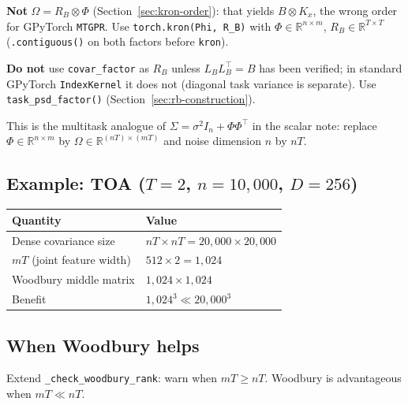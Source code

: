 \documentclass[11pt]{article}
\theoremstyle{plain}
\newcommand{\noise}{\sigma^2}
\newcommand{\Sig}{\Sigma}
\newcommand{\Ph}{\Phi}
\newcommand{\Om}{\Omega}
\newcommand{\LB}{L_B}
\newcommand{\RB}{R_B}
\begin{document}
\begin{diffbox}
\textbf{Not} $\Om = \RB \otimes \Ph$ (Section~\ref{sec:kron-order}): that yields $B \otimes K_x$,
the wrong order for GPyTorch \texttt{MTGPR}. Use \texttt{torch.kron(Phi, R\_B)} with
$\Ph \in \mathbb{R}^{n \times m}$, $\RB \in \mathbb{R}^{T \times T}$
(\texttt{.contiguous()} on both factors before \texttt{kron}).

\textbf{Do not} use \texttt{covar\_factor} as $\RB$ unless $\LB\LB^\top = B$ has been verified;
in standard GPyTorch \texttt{IndexKernel} it does not (diagonal task variance is separate).
Use \texttt{task\_psd\_factor()} (Section~\ref{sec:rb-construction}).
\end{diffbox}

\begin{samebox}
This is the multitask analogue of $\Sig = \noise I_n + \Ph\Ph^\top$ in the scalar note:
replace $\Ph \in \mathbb{R}^{n \times m}$ by $\Om \in \mathbb{R}^{(nT) \times (mT)}$
and noise dimension $n$ by $nT$.
\end{samebox}

\subsection{Example: TOA ($T=2$, $n=10{,}000$, $D=256$)}

\begin{center}
\renewcommand{\arraystretch}{1.2}
\begin{tabular}{@{}ll@{}}
\toprule
Quantity & Value \\
\midrule
Dense covariance size & $nT \times nT = 20{,}000 \times 20{,}000$ \\
$mT$ (joint feature width) & $512 \times 2 = 1{,}024$ \\
Woodbury middle matrix & $1{,}024 \times 1{,}024$ \\
Benefit & $1{,}024^3 \ll 20{,}000^3$ \\
\bottomrule
\end{tabular}
\end{center}

\subsection{When Woodbury helps}

Extend \texttt{\_check\_woodbury\_rank}: warn when $mT \ge nT$.
Woodbury is advantageous when $mT \ll nT$.

\end{document}
